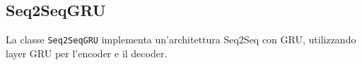 \subsection{Seq2SeqGRU}
La classe \texttt{Seq2SeqGRU} implementa un'architettura Seq2Seq con GRU, utilizzando layer GRU per l'encoder e il decoder.
